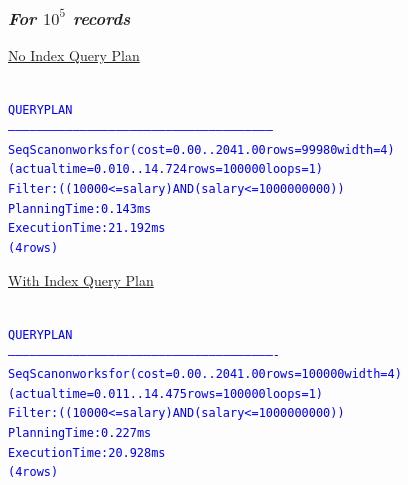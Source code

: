 \documentclass{article}
\begin{document}
    \subsubsection*{\emph{For $10^5$ records}}
    \underline{No Index Query Plan}
    \begin{center}
      {\tiny
      \begin{alltt}
      \textcolor{blue}{
        QUERY PLAN                                                   
        ---------------------------------------------------------------------------------------------------------------
         Seq Scan on worksfor  (cost=0.00..2041.00 rows=99980 width=4) (actual time=0.010..14.724 rows=100000 loops=1)
           Filter: ((10000 <= salary) AND (salary <= 1000000000))
         Planning Time: 0.143 ms
         Execution Time: 21.192 ms
        (4 rows)
       }
      \end{alltt}
      }
    \end{center}
    \underline{With Index Query Plan}
    \begin{center}
      {\tiny
      \begin{alltt}
      \textcolor{blue}{
        QUERY PLAN                                                   
        ----------------------------------------------------------------------------------------------------------------
         Seq Scan on worksfor  (cost=0.00..2041.00 rows=100000 width=4) (actual time=0.011..14.475 rows=100000 loops=1)
           Filter: ((10000 <= salary) AND (salary <= 1000000000))
         Planning Time: 0.227 ms
         Execution Time: 20.928 ms
        (4 rows)
       }
      \end{alltt}
      }
    \end{center}
\end{document}
